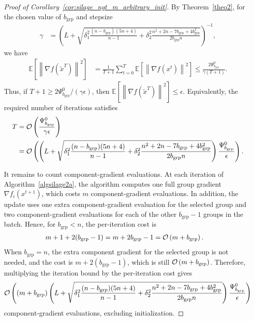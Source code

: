 \documentclass{article}
\newcommand{\bb}{\mathbb}
\newcommand{\sqn}[1]{\left\| #1 \right\|^2}
\newcommand{\nf}[1]{\nabla f\rb{#1}}
\newcommand{\cO}{{\cal O}}
\newcommand{\Exp}[1]{{\bb E}\left[#1\right]}
\newcommand{\rb}[1]{\left(#1\right)}
\newcommand {\rbl}[1]{(#1)} %
\renewcommand{\nf}[1]{\nabla f\rbl{#1}}
\newcommand{\nfi}[1]{\nabla f_i\rbl{#1}}
\theoremstyle{plain}
\begin{document}
\silageNgtMArbitraryInit*

\begin{proof}[Proof of Corollary~\ref{cor:silage_ngt_m_arbitrary_init}]
By Theorem~\ref{theo2}, for the chosen value of $b_{\mathrm{grp}}$ and stepsize
\begin{align*}
\gamma
&=
\rb{
L+\sqrt{
\delta_1^2\frac{(n-b_{\mathrm{grp}})(5n+4)}{n-1}
+\delta_2^2\frac{n^2+2n-7b_{\mathrm{grp}}+4b_{\mathrm{grp}}^2}{2b_{\mathrm{grp}}n}}
}^{-1},
\end{align*}
we have
\begin{align*}
\Exp{\sqn{\nf{\tilde{x}^T}}}
&=
\frac{1}{T+1}\sum_{t=0}^{T}\Exp{\sqn{\nf{x^t}}}
\le
\frac{2\Psi_{b_{\mathrm{grp}}}^0}{\gamma(T+1)}.
\end{align*}
Thus, if $T+1\ge 2\Psi_{b_{\mathrm{grp}}}^0/(\gamma\epsilon)$, then $\Exp{\sqn{\nf{\tilde{x}^T}}}\le \epsilon$. Equivalently, the required number of iterations satisfies
\begin{align*}
T
&=
\cO\rb{
\frac{\Psi_{b_{\mathrm{grp}}}^0}{\gamma\epsilon}
}
\\
&=
\cO\rb{
\rb{
L+\sqrt{
\delta_1^2\frac{(n-b_{\mathrm{grp}})(5n+4)}{n-1}
+\delta_2^2\frac{n^2+2n-7b_{\mathrm{grp}}+4b_{\mathrm{grp}}^2}{2b_{\mathrm{grp}}n}}
}
\frac{\Psi_{b_{\mathrm{grp}}}^0}{\epsilon}
}.
\end{align*}

It remains to count component-gradient evaluations. At each iteration of Algorithm~\ref{algsilage2a}, the algorithm computes one full group gradient $\nfi{x^{t+1}}$, which costs $m$ component-gradient evaluations. In addition, the update uses one extra component-gradient evaluation for the selected group and two component-gradient evaluations for each of the other $b_{\mathrm{grp}}-1$ groups in the batch. Hence, for $b_{\mathrm{grp}}<n$, the per-iteration cost is
\begin{align*}
m+1+2(b_{\mathrm{grp}}-1)
&=
m+2b_{\mathrm{grp}}-1
=
\cO\rb{m+b_{\mathrm{grp}}}.
\end{align*}
When $b_{\mathrm{grp}}=n$, the extra component gradient for the selected group is not needed, and the cost is $m+2(b_{\mathrm{grp}}-1)$, which is still $\cO\rb{m+b_{\mathrm{grp}}}$. Therefore, multiplying the iteration bound by the per-iteration cost gives
\begin{align*}
\cO\rb{
(m+b_{\mathrm{grp}})
\rb{
L+\sqrt{
\delta_1^2\frac{(n-b_{\mathrm{grp}})(5n+4)}{n-1}
+\delta_2^2\frac{n^2+2n-7b_{\mathrm{grp}}+4b_{\mathrm{grp}}^2}{2b_{\mathrm{grp}}n}}
}
\frac{\Psi_{b_{\mathrm{grp}}}^0}{\epsilon}
}
\end{align*}
component-gradient evaluations, excluding initialization.


\end{proof}
\end{document}
